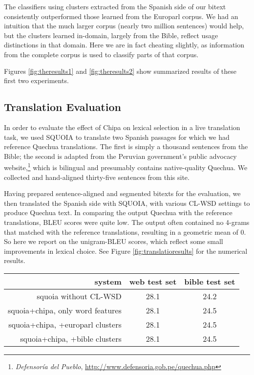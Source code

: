 \documentclass[10pt, a4paper]{article}
\begin{document}
The classifiers using clusters extracted from the Spanish side of our bitext
consistently outperformed those learned from the Europarl corpus. We had an
intuition that the much larger corpus (nearly two million sentences) would
help, but the clusters learned in-domain, largely from the Bible, reflect
usage distinctions in that domain. Here we are in fact cheating slightly, as
information from the complete corpus is used to classify parts of that corpus.

Figures \ref{fig:theresults1} and \ref{fig:theresults2} show 
summarized results of these first two experiments.

\subsection{Translation Evaluation}
In order to evaluate the effect of Chipa on lexical selection in a live
translation task, we used SQUOIA to translate two Spanish passages for which we
had reference Quechua translations. The first is simply a thousand sentences
from the Bible; the second is adapted from the Peruvian government's public
advocacy website,\footnote{\emph{Defensoría del Pueblo},
\url{http://www.defensoria.gob.pe/quechua.php}} which is bilingual and
presumably contains native-quality Quechua. We collected and hand-aligned
thirty-five sentences from this site.

Having prepared sentence-aligned and segmented bitexts for the evaluation,
we then translated the Spanish side with SQUOIA, with various CL-WSD settings
to produce Quechua text. In comparing the output Quechua with the reference
translations, BLEU scores were quite low. The output often contained no 4-grams
that matched with the reference translations, resulting in a geometric mean of
0. So here we report on the unigram-BLEU scores, which reflect some small
improvements in lexical choice.
See Figure \ref{fig:translatioresults} for the numerical results.

\begin{figure*}[t!]
  \begin{center}
  \begin{tabular}{|r|c|c|}
    \hline
    system                           & web test set & bible test set  \\
    \hline
    squoia without CL-WSD            & 28.1         & 24.2            \\
    squoia+chipa, only word features & 28.1         & 24.5            \\
    squoia+chipa, +europarl clusters & 28.1         & 24.5            \\
    squoia+chipa, +bible    clusters & 28.1         & 24.5            \\
    \hline
  \end{tabular}
  \end{center}
  \caption{BLEU-1 scores (modified unigram precision) for the various CL-WSD
  settings of SQUOIA on the two different Spanish-Quechua test sets.}
\label{fig:translatioresults}
\end{figure*}
\end{document}
